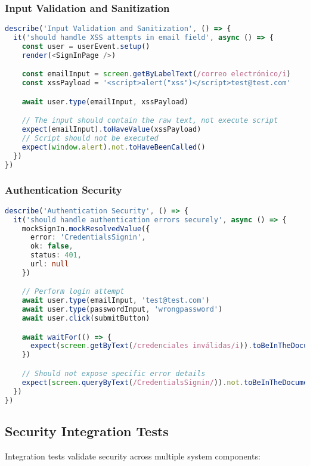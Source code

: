 \documentclass[12pt]{article}
\begin{document}
\subsubsection{Input Validation and Sanitization}
\begin{lstlisting}[language=typescript, caption=XSS Prevention Test]
describe('Input Validation and Sanitization', () => {
  it('should handle XSS attempts in email field', async () => {
    const user = userEvent.setup()
    render(<SignInPage />)

    const emailInput = screen.getByLabelText(/correo electrónico/i)
    const xssPayload = '<script>alert("xss")</script>test@test.com'

    await user.type(emailInput, xssPayload)

    // The input should contain the raw text, not execute script
    expect(emailInput).toHaveValue(xssPayload)
    // Script should not be executed
    expect(window.alert).not.toHaveBeenCalled()
  })
})
\end{lstlisting}

\subsubsection{Authentication Security}
\begin{lstlisting}[language=typescript, caption=Authentication Security Test]
describe('Authentication Security', () => {
  it('should handle authentication errors securely', async () => {
    mockSignIn.mockResolvedValue({
      error: 'CredentialsSignin',
      ok: false,
      status: 401,
      url: null
    })

    // Perform login attempt
    await user.type(emailInput, 'test@test.com')
    await user.type(passwordInput, 'wrongpassword')
    await user.click(submitButton)

    await waitFor(() => {
      expect(screen.getByText(/credenciales inválidas/i)).toBeInTheDocument()
    })

    // Should not expose specific error details
    expect(screen.queryByText(/CredentialsSignin/)).not.toBeInTheDocument()
  })
})
\end{lstlisting}

\subsection{Security Integration Tests}

Integration tests validate security across multiple system components:
\end{document}
